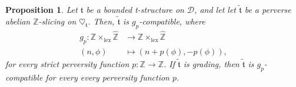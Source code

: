 \documentclass{article}
\newtheorem{prop}[thm]{Proposition}
\theoremstyle{definition}
\newcommand{\Z}{\mathbb{Z}}
\newcommand{\tee}{\mathfrak{t}}
\begin{document}
\begin{prop}\label{grad}
Let $\mathfrak{t}$ be a bounded t-structure on $\mathscr{D}$, and let let $\tilde{\tee}$ be a perverse abelian $\mathbb{Z}$-slicing on $\heartsuit_{\mathfrak{t}}$. Then, $\tilde{\tee}$ is $g_p$-compatible, where 
\begin{align*}
g_p\colon \mathbb{Z} \times_{\mathrm{lex}} \hat{\mathbb{Z}}&\to \mathbb{Z} \times_{\mathrm{lex}} \hat{\mathbb{Z}}\\
(n,\phi)&\mapsto(n+p(\phi),-p(\phi)),
\end{align*}
for every  strict perversity function $p\colon \Z\to \Z$. If $\tilde{\tee}$ is grading, then $\tilde{\tee}$ is $g_p$-compatible for every every  perversity function $p$.
\end{prop}
\end{document}
